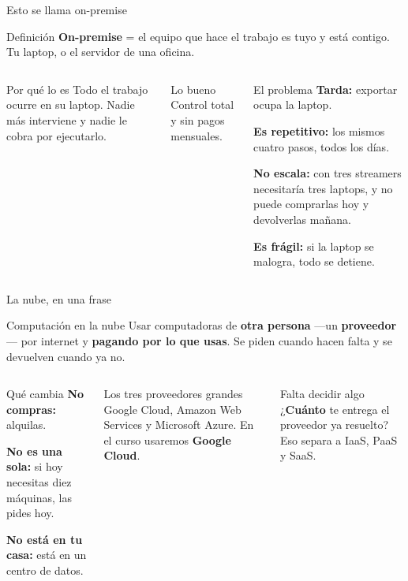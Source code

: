 \documentclass[aspectratio=169,10pt,c]{beamer}
\begin{document}
\begin{frame}{Esto se llama on-premise}
\begin{block}{Definición}
\small \textbf{On-premise} = el equipo que hace el trabajo es tuyo y está contigo. Tu laptop, o el servidor de una oficina.
\end{block}
\begin{columns}[T,onlytextwidth]
\begin{exampleblock}{Por qué lo es}
\small Todo el trabajo ocurre en su laptop. Nadie más interviene y nadie le cobra por ejecutarlo.
\end{exampleblock}
\begin{block}{Lo bueno}
\small Control total y sin pagos mensuales.
\end{block}
\begin{alertblock}{El problema}
\small
\textbf{Tarda:} exportar ocupa la laptop.\par\smallskip
\textbf{Es repetitivo:} los mismos cuatro pasos, todos los días.\par\smallskip
\textbf{No escala:} con tres streamers necesitaría tres laptops, y no puede comprarlas hoy y devolverlas mañana.\par\smallskip
\textbf{Es frágil:} si la laptop se malogra, todo se detiene.
\end{alertblock}
\end{columns}
\end{frame}

\begin{frame}{La nube, en una frase}
\begin{block}{Computación en la nube}
\small Usar computadoras de \textbf{otra persona} ---un \textbf{proveedor}--- por internet y \textbf{pagando por lo que usas}. Se piden cuando hacen falta y se devuelven cuando ya no.
\end{block}
\begin{columns}[T,onlytextwidth]
\begin{exampleblock}{Qué cambia}
\small
\textbf{No compras:} alquilas.\par\smallskip
\textbf{No es una sola:} si hoy necesitas diez máquinas, las pides hoy.\par\smallskip
\textbf{No está en tu casa:} está en un centro de datos.
\end{exampleblock}
\begin{block}{Los tres proveedores grandes}
\small Google Cloud, Amazon Web Services y Microsoft Azure. En el curso usaremos \textbf{Google Cloud}.
\end{block}
\begin{alertblock}{Falta decidir algo}
\small ¿\textbf{Cuánto} te entrega el proveedor ya resuelto? Eso separa a IaaS, PaaS y SaaS.
\end{alertblock}
\end{columns}
\end{frame}
\end{document}
